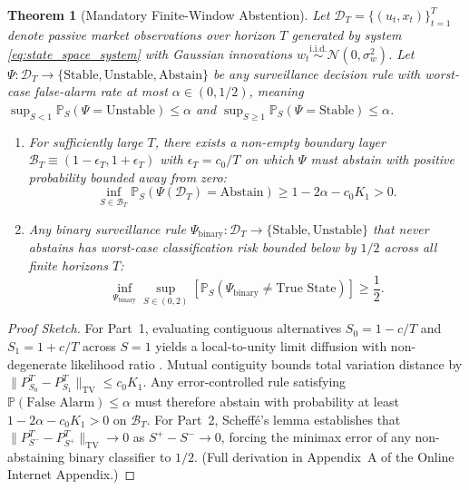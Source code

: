\documentclass[12pt]{article}
\newtheorem{theorem}{Theorem}[section]
\theoremstyle{definition}
\theoremstyle{remark}
\begin{document}
\begin{theorem}[Mandatory Finite-Window Abstention]
\label{thm:m3_minimax_abstention}
Let $\mathcal{D}_T = \{(u_t, x_t)\}_{t=1}^T$ denote passive market observations over horizon $T$ generated by system \eqref{eq:state_space_system} with Gaussian innovations $w_t \stackrel{\text{i.i.d.}}{\sim} \mathcal{N}(0, \sigma_w^2)$. Let $\Psi: \mathcal{D}_T \to \{\text{Stable}, \text{Unstable}, \text{Abstain}\}$ be any surveillance decision rule with worst-case false-alarm rate at most $\alpha \in (0, 1/2)$, meaning $\sup_{S < 1} \mathbb{P}_S(\Psi = \text{Unstable}) \le \alpha$ and $\sup_{S \ge 1} \mathbb{P}_S(\Psi = \text{Stable}) \le \alpha$.
\begin{enumerate}
    \item For sufficiently large $T$, there exists a non-empty boundary layer $\mathcal{B}_T \equiv (1 - \epsilon_T, 1 + \epsilon_T)$ with $\epsilon_T = c_0 / T$ on which $\Psi$ must abstain with positive probability bounded away from zero:
    \begin{equation}
    \inf_{S \in \mathcal{B}_T} \mathbb{P}_S\left(\Psi(\mathcal{D}_T) = \text{Abstain}\right) \ge 1 - 2\alpha - c_0 K_1 > 0.
    \label{eq:abstain_bound}
    \end{equation}
    \item Any binary surveillance rule $\Psi_{\text{binary}}: \mathcal{D}_T \to \{\text{Stable}, \text{Unstable}\}$ that never abstains has worst-case classification risk bounded below by $1/2$ across all finite horizons $T$:
    \begin{equation}
    \inf_{\Psi_{\text{binary}}} \sup_{S \in (0, 2)} \left[ \mathbb{P}_S(\Psi_{\text{binary}} \neq \text{True State}) \right] \ge \frac{1}{2}.
    \end{equation}
\end{enumerate}
\end{theorem}

\begin{proof}[Proof Sketch]
For Part~1, evaluating contiguous alternatives $S_0 = 1 - c/T$ and $S_1 = 1 + c/T$ across $S=1$ yields a local-to-unity limit diffusion with non-degenerate likelihood ratio \citep{phillips1987time}. Mutual contiguity bounds total variation distance by $\|P_{S_0}^T - P_{S_1}^T\|_{\text{TV}} \le c_0 K_1$. Any error-controlled rule satisfying $\mathbb{P}(\text{False Alarm}) \le \alpha$ must therefore abstain with probability at least $1 - 2\alpha - c_0 K_1 > 0$ on $\mathcal{B}_T$. For Part~2, Scheff\'{e}'s lemma establishes that $\|P_{S^-}^T - P_{S^+}^T\|_{\text{TV}} \to 0$ as $S^+ - S^- \to 0$, forcing the minimax error of any non-abstaining binary classifier to $1/2$. (Full derivation in Appendix~A of the Online Internet Appendix.)
\end{proof}
\end{document}
